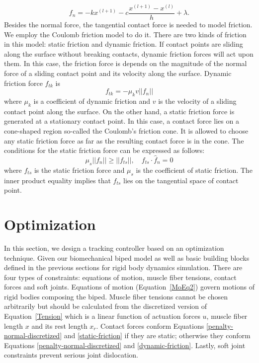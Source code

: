 \documentclass[master,english,final]{kaist-ucs}
\begin{document}
\begin{equation}\label{penalty-normal-discretized}
f_n = -k x^{(l+1)} - c \frac{x^{(l+1)} - x^{(l)}}{h} + \lambda.
\end{equation}
Besides the normal force, the tangential contact force is needed to model friction.
We employ the Coulomb friction model to do it.
There are two kinds of friction in this model: static friction and dynamic friction.
If contact points are sliding along the surface without breaking contacts,
dynamic friction forces will act upon them. In this case, the friction force is depends
on the magnitude of the normal force of a sliding contact point and its velocity along the surface.
Dynamic friction force $f_{tk}$ is
\begin{equation}\label{dynamic-friction}
f_{tk} = -\mu_k v ||f_n||
\end{equation}
where $\mu_k$ is a coefficient of dynamic friction
and $v$ is the velocity of a sliding contact point along the surface.
On the other hand, a static friction force is generated at a stationary contact point.
In this case, a contact force lies on a cone-shaped region so-called
the Coulomb's friction cone. It is allowed to choose any static friction force as far as
the resulting contact force is in the cone.
The conditions for the static friction force can be expressed as follows:
\begin{equation}\label{static-friction}
\mu_s ||f_n|| \geq ||f_{ts}||, \quad f_{ts} \cdot \hat{f}_n = 0
\end{equation}
where $f_{ts}$ is the static friction force and $\mu_s$ is the coefficient of static friction.
The inner product equality implies that $f_{ts}$ lies on the tangential space of contact point.



\section{Optimization}
In this section, we design a tracking controller based on an optimization technique.
Given our biomechanical biped model as well as basic building blocks defined in the previous
sections for rigid body dynamics simulation.
There are four types of constraints: equations of motion, muscle fiber tensions, contact forces and soft joints.
Equations of motion (Equation~\eqref{MoEq2}) govern motions of rigid bodies composing the biped.
Muscle fiber tensions cannot be chosen arbitrarily but should be calculated from the
discretized version of Equation~\eqref{Tension}
which is a linear function of actuation forces $u$, muscle fiber length $x$ and its rest length $x_r$.
Contact forces conform Equations \eqref{penalty-normal-discretized} and \eqref{static-friction} if
they are static; otherwise they conform Equations \eqref{penalty-normal-discretized} and \eqref{dynamic-friction}.
Lastly, soft joint constraints prevent serious joint dislocation.
\end{document}
